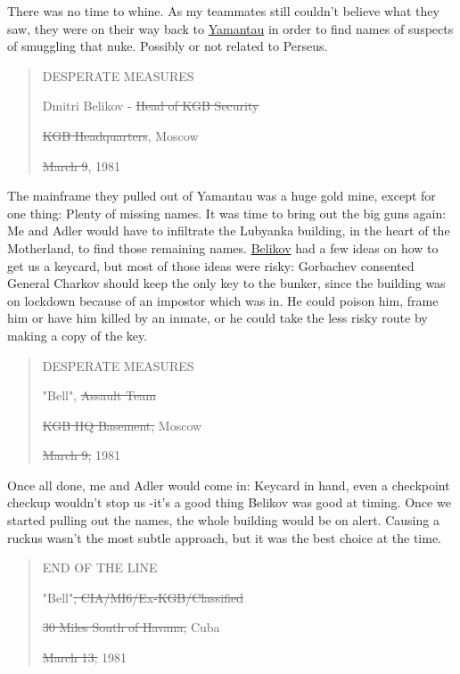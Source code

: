 \documentclass{article}
\begin{document}
There was no time to whine. As my teammates still couldn't believe what they saw, they were on their way back to \href{https://callofduty.fandom.com/wiki/WMD_(mission)/Transcript?so=search}{Yamantau} in order to find names of suspects of smuggling that nuke. Possibly or not related to Perseus.

\begin{quote}
    DESPERATE MEASURES
    
    Dmitri Belikov - \sout{Head of KGB Security}
    
    \sout{KGB Headquarters}, Moscow
    
    \sout{March 9}, 1981
\end{quote}

The mainframe they pulled out of Yamantau was a huge gold mine, except for one thing: Plenty of missing names. It was time to bring out the big guns again: Me and Adler would have to infiltrate the Lubyanka building, in the heart of the Motherland, to find those remaining names. \href{https://callofduty.fandom.com/wiki/Dimitri_Belikov}{Belikov} had a few ideas on how to get us a keycard, but most of those ideas were risky: Gorbachev consented General Charkov should keep the only key to the bunker, since the building was on lockdown because of an impostor which was in. He could poison him, frame him or have him killed by an inmate, or he could take the less risky route by making a copy of the key.

\begin{quote}
    DESPERATE MEASURES
    
    "Bell", \sout{Assault Team}
    
    \sout{KGB HQ Basement,} Moscow
    
    \sout{March 9,} 1981
\end{quote}

Once all done, me and Adler would come in: Keycard in hand, even a checkpoint checkup wouldn't stop us -it's a good thing Belikov was good at timing. Once we started pulling out the names, the whole building would be on alert. Causing a ruckus wasn't the most subtle approach, but it was the best choice at the time.

\begin{quote}
    END OF THE LINE
    
    "Bell"\sout{, CIA/MI6/Ex-KGB/Classified}
    
    \sout{30 Miles South of Havana,} Cuba
    
    \sout{March 13,} 1981
\end{quote}
\end{document}
